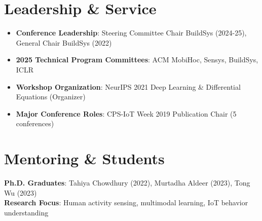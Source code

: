 \documentclass[11pt,letterpaper]{article}
\newcommand{\listentry}[1]{
    \item[\textcolor{accentBlue}{\small\faAngleRight}] #1
}
\begin{document}
\section{Leadership \& Service}
\begin{itemize}
\listentry{\textbf{\color{primaryBlue}Conference Leadership}: Steering Committee Chair BuildSys (2024-25), General Chair BuildSys (2022)}
\listentry{\textbf{\color{primaryBlue}2025 Technical Program Committees}: ACM MobiHoc, Sensys, BuildSys, ICLR}
\listentry{\textbf{\color{primaryBlue}Workshop Organization}: NeurIPS 2021 Deep Learning \& Differential Equations (Organizer)}
\listentry{\textbf{\color{primaryBlue}Major Conference Roles}: CPS-IoT Week 2019 Publication Chair (5 conferences)}
\end{itemize}

\section{Mentoring \& Students}
\textbf{\color{primaryBlue}Ph.D. Graduates}: Tahiya Chowdhury (2022), Murtadha Aldeer (2023), Tong Wu (2023)\\[2pt]
\textbf{\color{primaryBlue}Research Focus}: Human activity sensing, multimodal learning, IoT behavior understanding

\vspace{4pt}
\begin{center}
\end{center}
\end{document}

